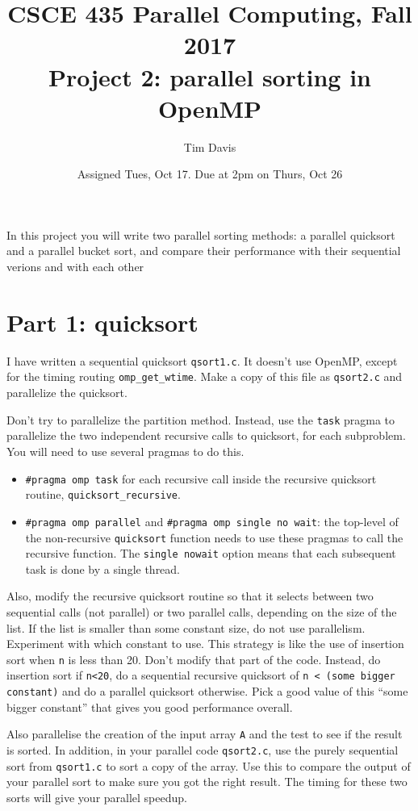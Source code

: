 \documentclass[11pt]{article}
\title{CSCE 435 Parallel Computing, Fall 2017 \\
Project 2: parallel sorting in OpenMP}
\author{Tim Davis}
\date{Assigned Tues, Oct 17.  Due at 2pm on Thurs, Oct 26}
\begin{document}
\maketitle

In this project you will write two parallel sorting methods:
a parallel quicksort and a parallel bucket sort,
and compare their performance with their sequential verions
and with each other

\section{Part 1: quicksort}
I have written a sequential quicksort \verb'qsort1.c'.
It doesn't use OpenMP, except for the timing routing \verb'omp_get_wtime'.
Make a copy of this file as \verb'qsort2.c' and parallelize the quicksort.

Don't try to parallelize the partition method.  Instead, use the \verb'task'
pragma to parallelize the two independent recursive calls to quicksort, for
each subproblem.  You will need to use several pragmas to do this.

\begin{itemize}
\item \verb'#pragma omp task' for each recursive call inside the recursive
quicksort routine, \verb'quicksort_recursive'.
\item \verb'#pragma omp parallel' and
\verb'#pragma omp single no wait':
the top-level of the non-recursive \verb'quicksort' function needs to use these
pragmas to call the recursive function.  The \verb'single nowait' option
means that each subsequent task is done by a single thread.
\end{itemize}

Also, modify the recursive quicksort routine so that it selects between
two sequential calls (not parallel) or two parallel calls, depending
on the size of the list.  If the list is smaller than some constant size,
do not use parallelism.  Experiment with which constant to use.  This
strategy is like the use of insertion sort when \verb'n' is less than 20.
Don't modify that part of the code.  Instead, do insertion sort if \verb'n<20',
do a sequential recursive quicksort of \verb'n < (some bigger constant)' and do
a parallel quicksort otherwise.  Pick a good value of this ``some bigger constant''
that gives you good performance overall.

Also parallelise the creation of the input array \verb'A' and the test to
see if the result is sorted.  In addition, in your parallel code \verb'qsort2.c',
use the purely sequential sort from \verb'qsort1.c' to sort a copy of the array.
Use this to compare the output of your parallel sort to make sure you got the
right result.  The timing for these two sorts will give your parallel speedup.
\end{document}
